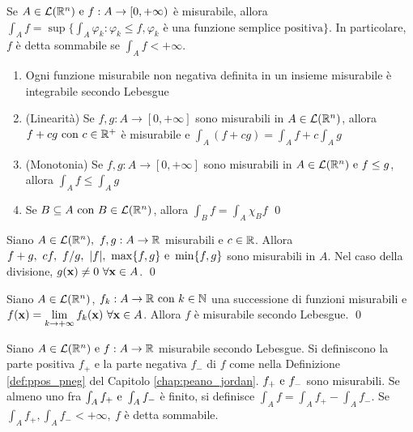 \begin{definition}
	Se $A\in \mathcal{L}(\mathbb{R}^n) \text{ e } f:A\to [0,+\infty)$ è misurabile, allora $\int_Af=\sup\{\int_A \varphi_k:\varphi_k \leq f, \varphi_k \text{ è una funzione semplice positiva}\}$. In particolare, $f$ è detta sommabile se $\int_A f<+\infty$.
\end{definition}

\begin{theorem}
	\label{thm:int_nonneg}
	\leavevmode
	\begin{enumerate}
		\item\label{item:mis_int} Ogni funzione misurabile non negativa definita in un insieme misurabile è integrabile secondo Lebesgue
		\item (Linearità) Se $f,g:A\to [0,+\infty]$ sono misurabili in $A\in \mathcal{L}(\mathbb{R}^n)$, allora $f+cg \text{ con } c \in \mathbb{R}^+$ è misurabile e $\int_A (f+cg)=\int_Af+c\int_Ag$
		\item (Monotonia) Se $f,g:A\to[0,+\infty]$ sono misurabili in $A\in\mathcal{L}(\mathbb{R}^n) \text{ e } f\leq g$, allora $\int_Af\leq\int_Ag$
		\item Se $B\subseteq A \text{ con } B\in \mathcal{L}(\mathbb{R}^n)$, allora $\int_Bf=\int_A\chi_Bf$
		\qed
	\end{enumerate}
\end{theorem}

\begin{theorem}
	Siano $A \in \mathcal{L}(\R^n), \ f,g:A\to\R$ misurabili e $c \in \mathbb{R}$. Allora $f+g,\ cf,\ f/g,\ \abs{f},\ \max\{f,g\} \e \min\{f,g\}$ sono misurabili in $A$. Nel caso della divisione, $g(\vb{x})\neq 0 \ \forall \vb{x} \in A$.
	\qed
\end{theorem}

\begin{theorem}
	\label{thm:mis_conv}
	Siano $A \in \mathcal{L}(\mathbb{R}^n)$, $f_k:A\to\mathbb{R} \text{ con } k \in \mathbb{N}$ una successione di funzioni misurabili e $f(\vb{x})=\lim\limits_{k\to+\infty}f_k(\vb{x}) \ \forall \vb{x} \in A$. Allora $f$ è misurabile secondo Lebesgue.
	\qed
\end{theorem}

\begin{definition}
	Siano $A\in\mathcal{L}(\mathbb{R}^n) \text{ e } f:A\to\mathbb{R}$ misurabile secondo Lebesgue. Si definiscono la parte positiva $f_+$ e la parte negativa $f_-$ di $f$ come nella Definizione \ref{def:ppos_pneg} del Capitolo \ref{chap:peano_jordan}. $f_+ \text{ e } f_-$ sono misurabili. Se almeno uno fra $\int_A f_+ \text{ e } \int_A f_-$ è finito, si definisce $\int_A f= \int_A f_+ - \int_A f_-$. Se $\int_A f_+,\int_A f_- <+\infty, \ f$ è detta sommabile.
\end{definition}

